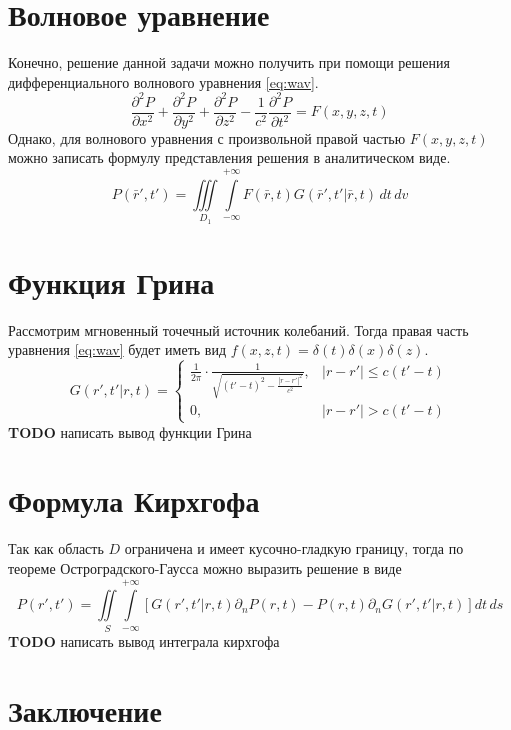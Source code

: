 \documentclass[a4paper, fontsize=14pt]{article} \usepackage{course_work}
\begin{document}
	\section{Волновое уравнение}
	Конечно, решение данной задачи можно получить при помощи решения дифференциального волнового уравнения \ref{eq:wav}. 
	\begin{equation}
		\frac{\partial^2 P}{\partial x^2} + \frac{\partial^2 P}{\partial y^2} + \frac{\partial^2 P}{\partial z^2} - \frac{1}{c^2} \frac{\partial^2 P}{\partial t^2} = F(x,y,z,t)   
	\label{eq:wav}	
	\end{equation}
	Однако, для волнового уравнения с произвольной правой частью $F(x,y,z,t)$ можно записать формулу представления решения 
	в аналитическом виде.
	\begin{equation}
		P(\bar{r}',t')=\iiint\limits_{D_1} \int\limits_{-\infty}^{+\infty} F(\bar{r},t) G(\bar{r}',t'|\bar{r},t)\,dt\,dv
	\end{equation}
	\section{Функция Грина} 

Рассмотрим мгновенный точечный источник колебаний. Тогда правая часть уравнения \ref{eq:wav} будет иметь вид $f(x,z,t) = \delta(t)\delta(x)\delta(z)$.
$$
G(r',t'|r,t)=\begin{cases}
	\frac{1}{2\pi}\cdot\frac{1}{\sqrt{(t'-t)^2-\frac{|r-r'|^2}{c^2}}},  &|r-r'|\leq c(t'-t)\\
	0, &|r-r'|>c(t'-t)
\end{cases}
$$
\textbf{TODO} написать вывод функции Грина
	
	\section{Формула Кирхгофа}
	Так как область $D$ ограничена и имеет кусочно-гладкую границу, тогда по теореме Остроградского-Гаусса можно выразить решение в виде 
	$$
	P(r',t') = \iint\limits_{S} \int\limits_{-\infty}^{+\infty} 
	[G(r',t'|r,t)\partial_n P(r,t) 
	- P(r,t)\partial_n G(r',t'|r,t)] dt\,ds
	$$
	\textbf{TODO} написать вывод интеграла кирхгофа
	
	

	

	
	
	\clearpage
	
	
	\section*{Заключение} 
	
	\newpage
	
	
	\printbibliography
	
	\newpage
	
	
	
\end{document}

